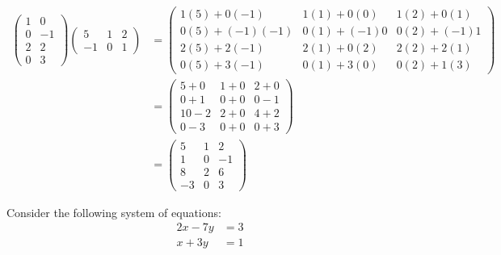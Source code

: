 \documentclass[12pt,letterpaper]{exam}
\begin{document}
\begin{questions}
\begin{parts}
		\[
		\begin{aligned}
		\begin{pmatrix}
		1 & 0 \\
		0 & -1 \\
		2 & 2 \\
		0 & 3
		\end{pmatrix}
		\begin{pmatrix}
		5 & 1 & 2 \\
		-1 & 0 & 1 
		\end{pmatrix}&= 
		\begin{pmatrix}
		1(5) + 0(-1) & 1(1) + 0(0) & 1(2) + 0(1) \\
		0(5) + (-1)(-1) & 0(1) + (-1)0 & 0(2) + (-1)1 \\
		2(5) + 2(-1) & 2(1) + 0(2) & 2(2) + 2(1) \\
		0(5) + 3(-1) & 0(1) + 3(0) & 0(2) + 1(3)
		\end{pmatrix} \\[0.2cm]
		&= \begin{pmatrix}
		5 + 0 & 1 + 0 & 2 + 0 \\
		0 + 1 & 0 + 0 & 0 - 1 \\
		10 - 2 & 2 + 0 & 4 + 2 \\
		0 - 3 & 0 + 0 & 0 + 3 
		\end{pmatrix} \\[0.2cm]
		&= \begin{pmatrix}
		5 & 1 & 2 \\
		1 & 0 & -1 \\
		8 & 2 & 6 \\
		-3 & 0 & 3
		\end{pmatrix}
		\end{aligned}
		\]
	\end{parts}



\newpage
\question Consider the following system of equations:
	\[
	\begin{aligned}
	2x - 7y&= 3 \\
	x + 3y&= 1
	\end{aligned}
	\]

\end{questions}
\end{document}
